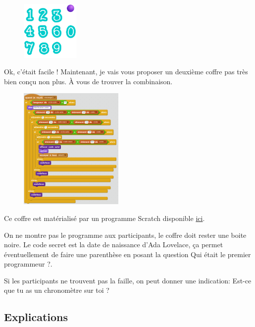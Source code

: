 \documentclass[a4paper]{article}
\newcommand{\guill}[1]{\og{}#1\fg{}}
\begin{document}
\begin{figure}
\centering
\includegraphics[width=0.25\textwidth]{scratch-digicode-screen.png}
\end{figure}

\guill{Ok, c'était facile ! Maintenant, je vais vous proposer un deuxième coffre pas très bien conçu non plus. À vous de trouver la combinaison.}

\begin{figure}
\centering
\includegraphics[width=0.45\textwidth]{scratch-digicode.png}
\end{figure}

Ce coffre est matérialisé par un programme Scratch disponible 
\href{https://scratch.mit.edu/projects/228338538/#player}{ici}.

On ne montre pas le programme aux participants, le coffre doit rester une boite noire. Le code secret est la date de naissance d'Ada Lovelace, ça permet éventuellement de faire une parenthèse en posant la question \guill{Qui était le premier programmeur ?}.

Si les participants ne trouvent pas la faille, on peut donner une indication:
\guill{Est-ce que tu as un chronomètre sur toi ?}

\subsection{Explications}
\end{document}
